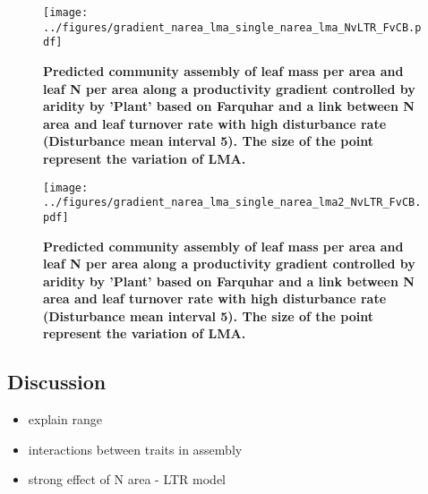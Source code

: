 \documentclass[a4paper,11pt]{article}
\begin{document}
\begin{figure}[ht]
\centering
\texttt{[image: ../figures/gradient\_narea\_lma\_single\_narea\_lma\_NvLTR\_FvCB.pdf]}
\caption{\textbf{Predicted community assembly of leaf mass per area and leaf N per area along a productivity gradient controlled by aridity by 'Plant' based on Farquhar and a link between N area and leaf turnover rate with high disturbance rate (Disturbance mean interval 5). The size of the point represent the variation of LMA.}
\label{fig:lma_nareaFh}}
\end{figure}

\begin{figure}[ht]
\centering
\texttt{[image: ../figures/gradient\_narea\_lma\_single\_narea\_lma2\_NvLTR\_FvCB.pdf]}
\caption{\textbf{Predicted community assembly of leaf mass per area and leaf N per area along a productivity gradient controlled by aridity by 'Plant' based on Farquhar and a link between N area and leaf turnover rate with high disturbance rate (Disturbance mean interval 5). The size of the point represent the variation of LMA.}
\label{fig:lma_nareaFh2}}
\end{figure}



\clearpage

\subsection{Discussion}



\begin{itemize}

\item explain range

\item interactions between traits in assembly

\item strong effect of N area - LTR model

\end{itemize}






\end{document}

